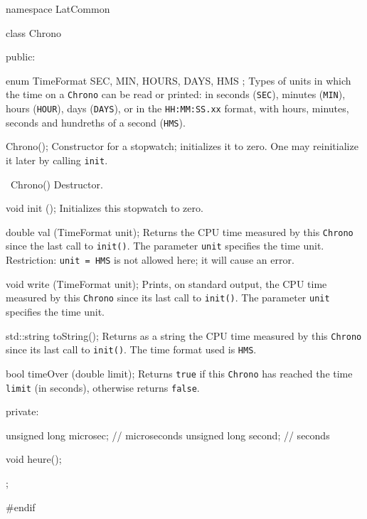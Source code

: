 namespace LatCommon {

class Chrono {
public:

   enum TimeFormat { SEC, MIN, HOURS, DAYS, HMS };
\endcode
 \tabb
  Types of units in which the time on a \texttt{Chrono} can be 
  read or printed: in seconds (\texttt{SEC}), minutes (\texttt{MIN}),
  hours (\texttt{HOUR}), days
  (\texttt{DAYS}), or in the \texttt{HH:MM:SS.xx} format, with hours, 
  minutes, seconds and hundreths of a second (\texttt{HMS}).
 \endtabb
\code

   Chrono();
\endcode
  \tabb Constructor for a stopwatch; initializes it to zero.
   One may reinitialize it later by calling \texttt{init}.
  \endtabb
\code

   ~Chrono() \hide {} \endhide
\endcode
\tabb
Destructor.
\endtabb
\code

   void init ();
\endcode
  \tabb
  Initializes this stopwatch to zero.
  \endtabb
\code

   double val (TimeFormat unit);
\endcode
  \tabb
  Returns the CPU time measured by this \texttt{Chrono} since the last call to
  \texttt{init()}. The parameter \texttt{unit} specifies the time unit.
  Restriction: \texttt{unit = HMS} is not allowed here; 
  it will cause an error.
  \endtabb
\code

   void write (TimeFormat unit);
\endcode
 \tabb
  Prints, on standard output, the CPU time measured by this 
  \texttt{Chrono} since its last  call to \texttt{init()}.
  The parameter \texttt{unit} specifies the time unit.
 \endtabb
\code

   std::string toString();
\endcode
 \tabb
  Returns as a string the CPU time measured by this \texttt{Chrono}
  since its last call to \texttt{init()}. The time format used is \texttt{HMS}.
 \endtabb
\code

   bool timeOver (double limit);
\endcode
 \tabb
 Returns \texttt{true} if this \texttt{Chrono} has reached the 
 time \texttt{limit} (in seconds), otherwise returns \texttt{false}.
 \endtabb
\code


private:

   unsigned long microsec;         // microseconds
   unsigned long second;           // seconds

   void heure();
};

}
\hide
#endif
\endhide
\endcode
